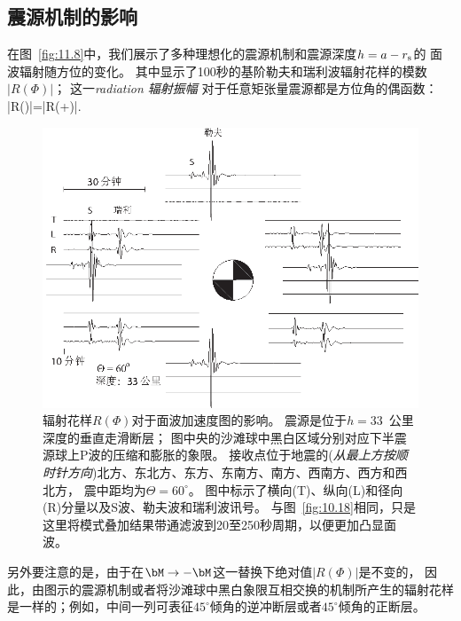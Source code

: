 \subsection{震源机制的影响}
\label{11.sec.radpat}

在图~\ref{fig:11.8}中，我们展示了多种理想化的震源机制和震源深度$h=a-r_{\rm s}$的
面波辐射随方位的变化。
其中显示了100秒的基阶勒夫和瑞利波辐射花样的模数$|R(\Phi)|$；
这一{\em radiation
辐射振幅\/}
%
%
对于任意矩张量震源都是方位角的偶函数：
\eq 
|R(\Phi)|=|R(\Phi+\pi)|.
\en
\begin{figure}[!b]
\begin{center}
\includegraphics{../figures/chap11/fig20.eps}
\end{center}
\caption[surface seismo1]{
\label{fig:11.9}
辐射花样$R(\Phi)$对于面波加速度图的影响。
震源是位于$h=33$~公里深度的垂直走滑断层；
图中央的沙滩球中黑白区域分别对应下半震源球上P波的压缩和膨胀的象限。
接收点位于地震的({\em 从最上方按顺时针方向\/})北方、东北方、东方、东南方、南方、西南方、西方和西北方，
震中距均为$\Theta=60^{\circ}$。
图中标示了横向(T)、纵向(L)和径向(R)分量以及S波、勒夫波和瑞利波讯号。
与图~\protect\ref{fig:10.18}相同，只是这里将模式叠加结果带通滤波到20至250秒周期，以便更加凸显面波。}
\end{figure}
另外要注意的是，由于在$\bM\rightarrow -\bM$这一替换下绝对值$|R(\Phi)|$是不变的，
因此，由图示的震源机制或者将沙滩球中黑白象限互相交换的机制所产生的辐射花样是一样的；例如，中间一列可表征$45^{\circ}$倾角的逆冲断层或者$45^{\circ}$倾角的正断层。

